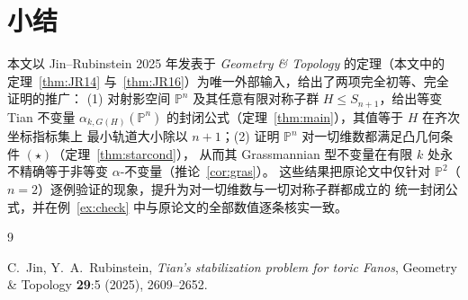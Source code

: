 \documentclass[11pt,a4paper]{article}
\theoremstyle{definition}
\theoremstyle{remark}
\newcommand{\PP}{\mathbb{P}}
\begin{document}
\section{小结}

本文以 Jin--Rubinstein 2025 年发表于 \emph{Geometry \& Topology} 的定理（本文中的
定理~\ref{thm:JR14} 与~\ref{thm:JR16}）为唯一外部输入，给出了两项完全初等、完全证明的推广：
(1) 对射影空间 $\PP^n$ 及其任意有限对称子群 $H \le S_{n+1}$，给出等变 Tian 不变量
$\alpha_{k,G(H)}(\PP^n)$ 的封闭公式（定理~\ref{thm:main}），其值等于 $H$ 在齐次坐标指标集上
最小轨道大小除以 $n+1$；(2) 证明 $\PP^n$ 对一切维数都满足凸几何条件 $(\star)$（定理~\ref{thm:starcond}），
从而其 Grassmannian 型不变量在有限 $k$ 处永不精确等于非等变 $\alpha$-不变量（推论~\ref{cor:gras}）。
这些结果把原论文中仅针对 $\PP^2$（$n=2$）逐例验证的现象，提升为对一切维数与一切对称子群都成立的
统一封闭公式，并在例~\ref{ex:check} 中与原论文的全部数值逐条核实一致。

\begin{thebibliography}{9}

 C.\ Jin, Y.\ A.\ Rubinstein, \emph{Tian's stabilization problem for toric Fanos},
Geometry \& Topology \textbf{29}:5 (2025), 2609--2652.

\end{thebibliography}
\end{document}
